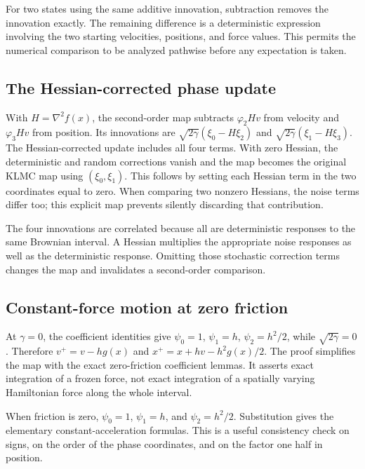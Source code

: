 \documentclass[11pt,a4paper]{report}
\begin{document}
For two states using the same additive innovation, subtraction removes the innovation exactly. The remaining difference is a deterministic expression involving the two starting velocities, positions, and force values. This permits the numerical comparison to be analyzed pathwise before any expectation is taken.

\subsection{\texorpdfstring{The Hessian-corrected phase update}{The Hessian-corrected phase update}}
\label{report-step-KineticLangevin-Integrator-lean-3}


With \(H=\nabla^2f(x)\), the second-order map subtracts \(\varphi_2Hv\) from velocity and \(\varphi_3Hv\) from position. Its innovations are \(\sqrt{2\gamma}(\xi_0-H\xi_2)\) and \(\sqrt{2\gamma}(\xi_1-H\xi_3)\). The Hessian-corrected update includes all four terms. With zero Hessian, the deterministic and random corrections vanish and the map becomes the original KLMC map using \((\xi_0,\xi_1)\). This follows by setting each Hessian term in the two coordinates equal to zero. When comparing two nonzero Hessians, the noise terms differ too; this explicit map prevents silently discarding that contribution.



The four innovations are correlated because all are deterministic responses to the same Brownian interval. A Hessian multiplies the appropriate noise responses as well as the deterministic response. Omitting those stochastic correction terms changes the map and invalidates a second-order comparison.

\subsection{\texorpdfstring{Constant-force motion at zero friction}{Constant-force motion at zero friction}}
\label{report-step-KineticLangevin-Integrator-lean-4}


At \(\gamma=0\), the coefficient identities give \(\psi_0=1\), \(\psi_1=h\), \(\psi_2=h^2/2\), while \(\sqrt{2\gamma}=0\). Therefore \(v^+=v-hg(x)\) and \(x^+=x+hv-h^2g(x)/2\). The proof simplifies the map with the exact zero-friction coefficient lemmas. It asserts exact integration of a frozen force, not exact integration of a spatially varying Hamiltonian force along the whole interval.



When friction is zero, \(\psi_0=1\), \(\psi_1=h\), and \(\psi_2=h^2/2\). Substitution gives the elementary constant-acceleration formulas. This is a useful consistency check on signs, on the order of the phase coordinates, and on the factor one half in position.
\end{document}

